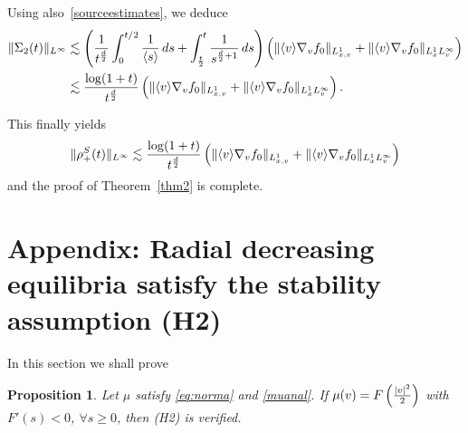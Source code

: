 \documentclass[11pt]{amsart}
\numberwithin{equation}{section}
\newtheorem{prop}{Proposition}[section]
\begin{document}
     Using also~\eqref{sourceestimates}, we deduce
           \begin{align*} \| \Sigma_{2}(t) \|_{L^\infty}  &\lesssim \left({ 1 \over t^{d \over 2}}  \int_{0}^{t/2} { 1 \over \langle s \rangle}\, ds
           +  \int_{t\over 2}^t { 1 \over s^{ {d \over 2} + 1}}\, ds\right)  \left(   \|\langle v\rangle \nabla_{v} f_{0} \|_{L^1_{x,v}} + \|  \langle v\rangle \nabla_{v}  f_{0}\|_{L^1_{x} L^\infty_{v}} \right) 
            \\
           &\lesssim { \log (1 + t) \over t^{d \over 2} } \left(   \|\langle v\rangle \nabla_{v} f_{0} \|_{L^1_{x,v}} + \|  \langle v\rangle \nabla_{v}  f_{0}\|_{L^1_{x} L^\infty_{v}} \right) 
.
           \end{align*} 
 
           
           This finally yields
        $$ \|\rho^S_{+}(t) \|_{L^\infty} \lesssim { \log (1+t) \over t^{d \over 2} } \left(   \|\langle v\rangle \nabla_{v} f_{0} \|_{L^1_{x,v}} + \|  \langle v\rangle \nabla_{v}  f_{0}\|_{L^1_{x} L^\infty_{v}} \right) 
$$
and the proof of Theorem~\ref{thm2} is complete.    
      
     
       
      
      
       
   




\section{Appendix: Radial decreasing equilibria  satisfy the stability assumption (H2)}
\label{appendix}

 In this section we shall prove
 \begin{prop}
 Let $\mu$ satisfy \eqref{eq:norma} and \eqref{muanal}. If  $\mu (v) = F\left( {  |v|^2 \over 2} \right)$ with  $F'(s) <0$, $\forall  s \geq  0$, then (H2) is verified.
 \end{prop}
  
\end{document}
